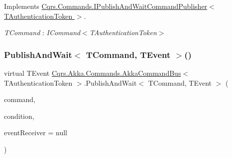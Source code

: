 Implements \hyperlink{interfaceCqrs_1_1Commands_1_1IPublishAndWaitCommandPublisher_a02ef39482cb50e6e15e06144adca1ed5_a02ef39482cb50e6e15e06144adca1ed5}{Cqrs.\+Commands.\+I\+Publish\+And\+Wait\+Command\+Publisher$<$ T\+Authentication\+Token $>$}.

\begin{Desc}
\item[Type Constraints]\begin{description}
\item[{\em T\+Command} : {\em I\+Command$<$T\+Authentication\+Token$>$}]\end{description}
\end{Desc}
\mbox{\label{classCqrs_1_1Akka_1_1Commands_1_1AkkaCommandBus_ad318bfb71c5a8f5e13994edce9bad99e_ad318bfb71c5a8f5e13994edce9bad99e}} 
\subsubsection{\texorpdfstring{Publish\+And\+Wait$<$ T\+Command, T\+Event $>$()}{PublishAndWait< TCommand, TEvent >()}\hspace{0.1cm}{\footnotesize\ttfamily [4/6]}}
{\footnotesize\ttfamily virtual T\+Event \hyperlink{classCqrs_1_1Akka_1_1Commands_1_1AkkaCommandBus}{Cqrs.\+Akka.\+Commands.\+Akka\+Command\+Bus}$<$ T\+Authentication\+Token $>$.Publish\+And\+Wait$<$ T\+Command, T\+Event $>$ (\begin{DoxyParamCaption}\item[{T\+Command}]{command,  }\item[{Func$<$ I\+Enumerable$<$ \hyperlink{interfaceCqrs_1_1Events_1_1IEvent}{I\+Event}$<$ T\+Authentication\+Token $>$$>$, T\+Event $>$}]{condition,  }\item[{\hyperlink{interfaceCqrs_1_1Events_1_1IEventReceiver}{I\+Event\+Receiver}$<$ T\+Authentication\+Token $>$}]{event\+Receiver = {\ttfamily null} }\end{DoxyParamCaption})\hspace{0.3cm}{\ttfamily [virtual]}}



